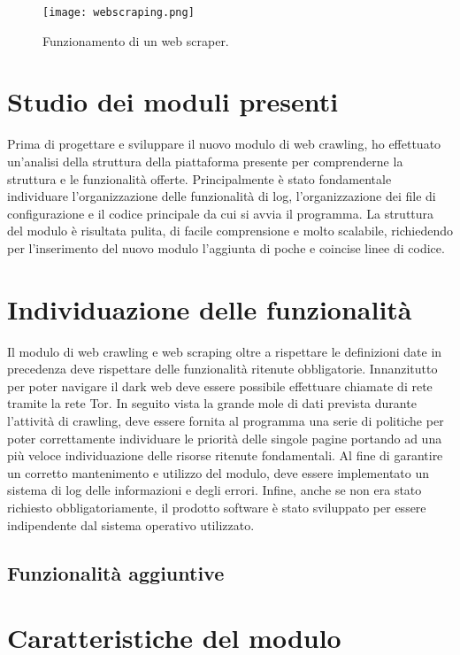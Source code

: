 \begin{figure}[!h] 
    \centering 
    \texttt{[image: webscraping.png]} 
    \caption{Funzionamento di un web scraper.}
\end{figure}


\section{Studio dei moduli presenti}

Prima di progettare e sviluppare il nuovo modulo di web crawling, ho effettuato un’analisi della struttura della piattaforma presente per comprenderne la struttura e le funzionalità offerte. Principalmente è stato fondamentale individuare l'organizzazione delle funzionalità di log, l'organizzazione dei file di configurazione e il codice principale da cui si avvia il programma. La struttura del modulo è risultata pulita, di facile comprensione e molto scalabile, richiedendo per l'inserimento del nuovo modulo l'aggiunta di poche e coincise linee di codice.


\section{Individuazione delle funzionalità}

Il modulo di web crawling e web scraping oltre a rispettare le definizioni date in precedenza deve rispettare delle funzionalità ritenute obbligatorie. Innanzitutto per poter navigare il dark web deve essere possibile effettuare chiamate di rete tramite la rete Tor. In seguito vista la grande mole di dati prevista durante l'attività di crawling, deve essere fornita al programma una serie di politiche per poter correttamente individuare le priorità delle singole pagine portando ad una più veloce individuazione delle risorse ritenute fondamentali. Al fine di garantire un corretto mantenimento e utilizzo del modulo, deve essere implementato un sistema di log delle informazioni e degli errori. Infine, anche se non era stato richiesto obbligatoriamente, il prodotto software è stato sviluppato per essere indipendente dal sistema operativo utilizzato.


\subsection{Funzionalità aggiuntive}

\section{Caratteristiche del modulo}

